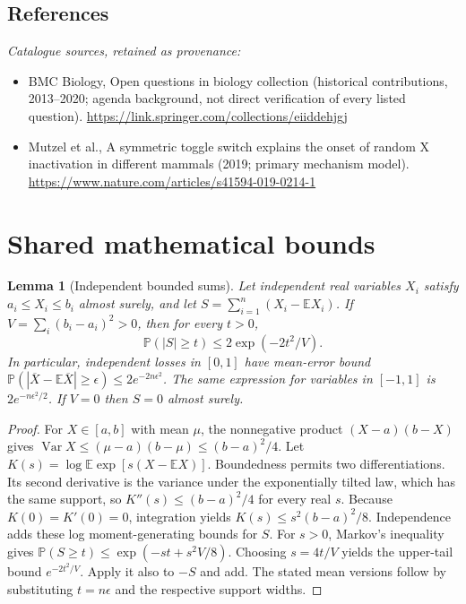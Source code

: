 \documentclass[11pt]{article}
\newcommand{\E}{\mathbb E}
\newcommand{\Prob}{\mathbb P}
\DeclareMathOperator{\Var}{Var}
\providecommand{\E}{\mathbb E}
\providecommand{\Prob}{\mathbb P}
\providecommand{\Var}{\operatorname{Var}}
\newtheorem{sharedlemma}{Lemma}[section]
\begin{document}
\subsection{References}
\noindent\emph{Catalogue sources, retained as provenance:}
\begin{itemize}
\item BMC Biology, Open questions in biology collection (historical contributions, 2013--2020; agenda background, not direct verification of every listed question). \url{https://link.springer.com/collections/eiiddehjgj}
\item Mutzel et al., A symmetric toggle switch explains the onset of random X inactivation in different mammals (2019; primary mechanism model). \url{https://www.nature.com/articles/s41594-019-0214-1}
\end{itemize}
\clearpage


\appendix
\section{Shared mathematical bounds}\label{app:bounds}
\begin{sharedlemma}[Independent bounded sums]\label{lem:bounded}
Let independent real variables $X_i$ satisfy $a_i\leq X_i\leq b_i$ almost surely,
and let $S=\sum_{i=1}^n(X_i-\E X_i)$. If
$V=\sum_i(b_i-a_i)^2>0$, then for every $t>0$,
\[
 \Prob(|S|\geq t)\leq 2\exp(-2t^2/V).
\]
In particular, independent losses in $[0,1]$ have mean-error bound
$\Prob(|\overline X-\E\overline X|\geq\epsilon)
\leq2e^{-2n\epsilon^2}$. The same expression for variables in $[-1,1]$
is $2e^{-n\epsilon^2/2}$. If $V=0$ then $S=0$ almost surely.
\end{sharedlemma}
\begin{proof}
For $X\in[a,b]$ with mean $\mu$, the nonnegative product
$(X-a)(b-X)$ gives
$\Var X\leq(\mu-a)(b-\mu)\leq(b-a)^2/4$.
Let $K(s)=\log\E\exp[s(X-\E X)]$.
Boundedness permits two differentiations. Its second derivative is the variance
under the exponentially tilted law, which has the same support, so
$K''(s)\leq(b-a)^2/4$ for every real $s$.
Because $K(0)=K'(0)=0$, integration yields
$K(s)\leq s^2(b-a)^2/8$.
Independence adds these log moment-generating bounds for $S$.
For $s>0$, Markov's inequality gives
$\Prob(S\geq t)\leq\exp(-st+s^2V/8)$.
Choosing $s=4t/V$ yields the upper-tail bound $e^{-2t^2/V}$.
Apply it also to $-S$ and add. The stated mean versions follow by substituting
$t=n\epsilon$ and the respective support widths.
\end{proof}
\end{document}
